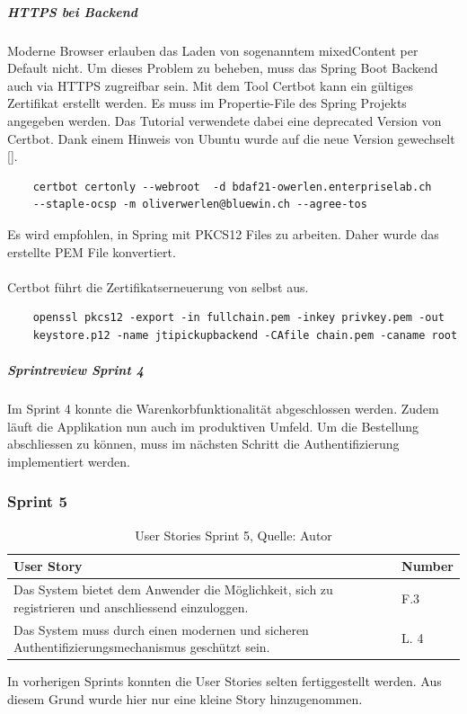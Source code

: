 \newpage
\subparagraph{HTTPS bei Backend}\label{httpsBackend}
Moderne Browser erlauben das Laden von sogenanntem \gls{mixedContent} per Default nicht. Um dieses Problem zu beheben, muss das Spring Boot Backend auch via HTTPS zugreifbar sein. Mit dem Tool Certbot kann ein gültiges Zertifikat erstellt werden. Es muss im \gls{Propertie-File} des Spring Projekts angegeben werden. Das Tutorial verwendete dabei eine deprecated Version von Certbot. Dank einem Hinweis von Ubuntu wurde auf die neue Version gewechselt [\cite{springSSL}]. 

\begin{verbatim}
	certbot certonly --webroot  -d bdaf21-owerlen.enterpriselab.ch 
	--staple-ocsp -m oliverwerlen@bluewin.ch --agree-tos
\end{verbatim}

Es wird empfohlen, in Spring mit PKCS12 Files zu arbeiten. Daher wurde das erstellte PEM File konvertiert. \\\\
Certbot führt die Zertifikatserneuerung von selbst aus. 
\begin{verbatim}
	openssl pkcs12 -export -in fullchain.pem -inkey privkey.pem -out 
	keystore.p12 -name jtipickupbackend -CAfile chain.pem -caname root
\end{verbatim}

\subparagraph{Sprintreview Sprint 4}
Im Sprint 4 konnte die Warenkorbfunktionalität abgeschlossen werden. Zudem läuft die Applikation nun auch im produktiven Umfeld.
Um die Bestellung abschliessen zu können, muss im nächsten Schritt die Authentifizierung implementiert werden.  

\subsubsection{Sprint 5}
\begin{table}[H]
	\setlength\extrarowheight{2pt} %
	\begin{tabularx}{\textwidth}{|X|l|}
		\hline
		\textbf{User Story} & \textbf{Number} \\
		\hline
		Das System bietet dem Anwender die Möglichkeit, sich zu registrieren und anschliessend einzuloggen. & F.3\\
		\hline
		Das System muss durch einen modernen und sicheren Authentifizierungsmechanismus geschützt sein. & L. 4\\
		\hline
	\end{tabularx} 
	\caption[User Stories Sprint 5]{User Stories Sprint 5, Quelle: Autor}
\end{table}\label{userStoriesSprint5}
 In vorherigen Sprints konnten die User Stories selten fertiggestellt werden. Aus diesem Grund wurde hier nur eine kleine Story hinzugenommen.
 
